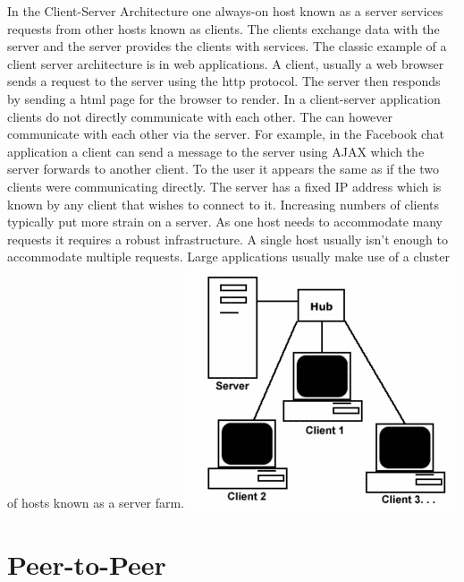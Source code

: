 \documentclass[11pt]{amsart}
\begin{document}
In the Client-Server Architecture one always-on host known as a server services requests from other hosts known as clients. The clients exchange data with the server and the server provides the clients with services. The classic example of a client server architecture is in web applications. A client, usually a web browser sends a request to the server using the http protocol. The server then responds by sending a html page for the browser to render. In a client-server application clients do not directly communicate with each other. The can however communicate with each other via the server. For example, in the Facebook chat application a client can send a message to the server using AJAX which the server forwards to another client. To the user it appears the same as if the two clients were communicating directly. The server has a fixed IP address which is known by any client that wishes to connect to it.
Increasing numbers of clients typically put more strain on a server. As one host needs to accommodate many requests it requires a robust infrastructure. A single host usually isn't enough to accommodate multiple requests. Large applications usually make use of a cluster of hosts known as a server farm.
\includegraphics[scale=1]{clientserver}\cite{ClientServer}

\section{Peer-to-Peer}
\end{document}
